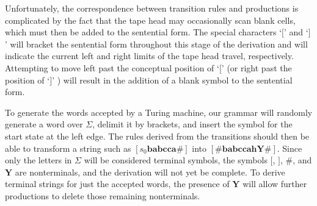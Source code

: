 Unfortunately, the correspondence between transition rules and productions is
complicated by the fact that the tape head may occasionally scan blank cells,
which must then be added to the sentential form. The special characters `$[$' and
`$]$' will bracket the sentential form throughout this stage of the derivation and
will indicate the current left and right limits of the tape head travel,
respectively. Attempting to move left past the conceptual position of `$[$' (or
right past the position of `$]$' ) will result in the addition of a blank symbol to
the sentential form.

To generate the words accepted by a Turing machine, our grammar will randomly
generate a word over $\Sigma$, delimit it by brackets, and insert the symbol for
the start state at the left edge. The rules derived from the transitions should
then be able to transform a string such as $[s_0\pmb{babcca\#}]$ into
$[\pmb{\#babccahY\#}]$. Since only the letters in $\Sigma$ will be considered
terminal symbols, the symbols $[$, $]$, $\pmb{\#}$, and $\pmb{Y}$ are
nonterminals, and the derivation will not yet be complete. To derive terminal
strings for just the accepted words, the presence of $\pmb{Y}$ will allow
further productions to delete those remaining nonterminals.

